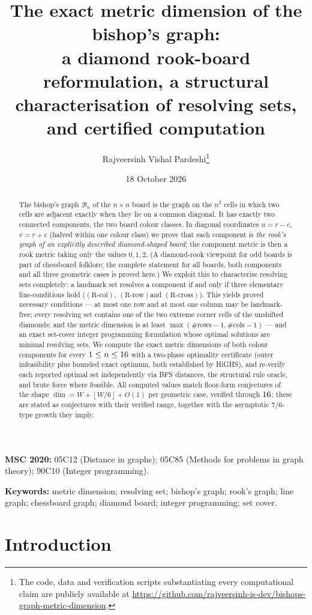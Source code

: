 \documentclass[12pt]{article}
\title{%
The exact metric dimension of the bishop's graph:\\
a diamond rook-board reformulation, a structural characterisation of resolving sets,\\
and certified computation}
\author{Rajveersinh Vishal Pardeshi\thanks{%
The code, data and verification scripts substantiating every computational claim are publicly available at
\protect\url{https://github.com/rajveersinh-is-dev/bishops-graph-metric-dimension}.}}
\date{18 October 2026}
\theoremstyle{definition}
\newcommand{\BB}{\mathcal{B}}
\newcommand{\floor}[1]{\left\lfloor #1 \right\rfloor}
\newcommand{\RRc}{\ensuremath{\mathrm{(R\text{-}col)}}}
\newcommand{\RRr}{\ensuremath{\mathrm{(R\text{-}row)}}}
\newcommand{\RRx}{\ensuremath{\mathrm{(R\text{-}cross)}}}
\begin{document}
\maketitle

\begin{abstract}
The bishop's graph $\BB_n$ of the $n\times n$ board is the graph on the $n^2$ cells in which two cells are adjacent exactly when they lie on a common diagonal. It has exactly two connected components, the two board colour classes. In diagonal coordinates $u=r-c$, $v=r+c$ (halved within one colour class) we prove that each component is \emph{the rook's graph of an explicitly described diamond-shaped board}; the component metric is then a rook metric taking only the values $0,1,2$. (A diamond-rook viewpoint for odd boards is part of chessboard folklore; the complete statement for all boards, both components and all three geometric cases is proved here.) We exploit this to characterise resolving sets completely: a landmark set resolves a component if and only if three elementary line-conditions hold (\RRc, \RRr and \RRx). This yields proved necessary conditions --- at most one row and at most one column may be landmark-free; every resolving set contains one of the two extreme corner cells of the unshifted diamonds; and the metric dimension is at least $\max(\#\text{rows}-1,\#\text{cols}-1)$ --- and an exact set-cover integer programming formulation whose optimal solutions are minimal resolving sets. We compute the exact metric dimensions of both colour components for every $1\le n\le 16$ with a two-phase optimality certificate (outer infeasibility plus bounded exact optimum, both established by HiGHS), and re-verify each reported optimal set independently via BFS distances, the structural rule oracle, and brute force where feasible. All computed values match floor-form conjectures of the shape $\dim=W+\floor{W/6}+O(1)$ per geometric case, verified through $16$; these are stated as conjectures with their verified range, together with the asymptotic $7/6$-type growth they imply.
\end{abstract}

\bigskip
\noindent\textbf{MSC 2020:} 05C12 (Distance in graphs); 05C85 (Methods for problems in graph theory); 90C10 (Integer programming).
\smallskip

\noindent\textbf{Keywords:} metric dimension; resolving set; bishop's graph; rook's graph; line graph; chessboard graph; diamond board; integer programming; set cover.

\section{Introduction}\label{sec:intro}
\end{document}
